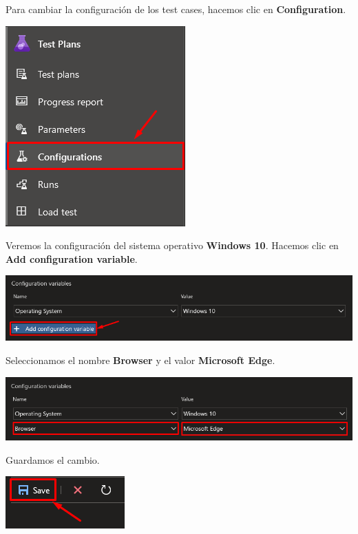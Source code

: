 \documentclass{elsarticle}
\begin{document}
Para cambiar la configuración de los test cases, hacemos clic en \textbf{Configuration}.
\begin{center}
	\includegraphics{img/Screenshot_30.png}
\end{center}

Veremos la configuración del sistema operativo \textbf{Windows 10}. Hacemos clic en \textbf{Add configuration variable}.
\begin{center}
	\includegraphics[width=\columnwidth]{img/Screenshot_31.png}
\end{center}

Seleccionamos el nombre \textbf{Browser} y el valor \textbf{Microsoft Edge}.
\begin{center}
	\includegraphics[width=\columnwidth]{img/Screenshot_32.png}
\end{center}

Guardamos el cambio.
\begin{center}
	\includegraphics{img/Screenshot_33.png}
\end{center}
\end{document}
